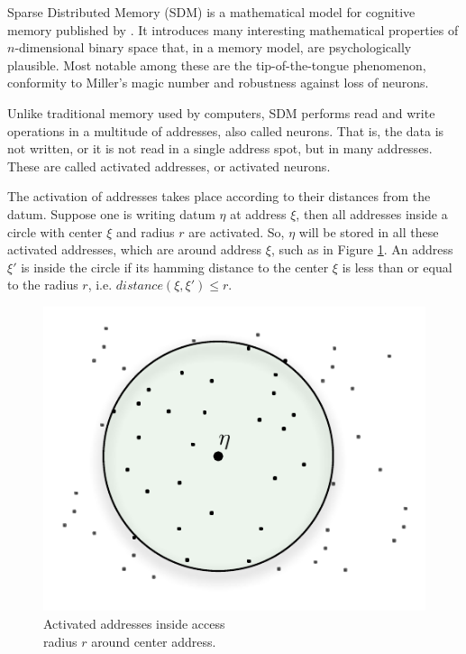 Sparse Distributed Memory (SDM) is a mathematical model for cognitive memory published by \citet{Kanerva1988}. It introduces many interesting mathematical properties of $n$-dimensional binary space that, in a memory model, are psychologically plausible.  Most notable among these are the tip-of-the-tongue phenomenon, conformity to Miller's magic number \citep{Linhares2011} and robustness against loss of neurons.

Unlike traditional memory used by computers, SDM performs read and write operations in a multitude of addresses, also called neurons.  That is, the data is not written, or it is not read in a single address spot, but in many addresses. These are called activated addresses, or activated neurons.

The activation of addresses takes place according to their distances from the datum. Suppose one is writing datum $\eta$ at address $\xi$, then all addresses inside a circle with center $\xi$ and radius $r$ are activated. So, $\eta$ will be stored in all these activated addresses, which are around address $\xi$, such as in Figure \ref{fig-addresses-inside-access-radius}.  An address $\xi'$ is inside the circle if its hamming distance to the center $\xi$ is less than or equal to the radius $r$, i.e. $distance(\xi,\xi')\leq r$.

\begin{figure}[h]
\centering\includegraphics[scale=0.75]{./images02/p_circle_r.pdf}

\caption{Activated addresses inside access \protect \\
radius $r$ around center address.\label{fig-addresses-inside-access-radius}}
\end{figure}


